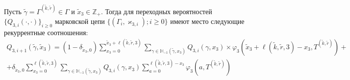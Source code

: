 \documentclass[a4paper,12pt,russian]{extarticle}
\newcommand{\MarkThree}{\{(\Gamma_i, \varkappa_{3,i}); i \geqslant 0\}}
\begin{document}
\begin{theorem}
Пусть $\tilde{\gamma} =\Gamma^{(\tilde{k},\tilde{r})}\in \Gamma$ и $\tilde{x}_3 \in {\mathbb Z}_+$. Тогда для переходных вероятностей $\{Q_{3,i}(\cdot,\cdot)\}_{i\geqslant 0}$ марковской цепи $\MarkThree$ имеют место следующие рекуррентные соотношения:
\begin{multline}
Q_{3,i+1}(\tilde{\gamma},\tilde{x}_3) = (1-\delta_{\tilde{x}_3,0}) \sum_{x_3=0}^{\tilde{x}_3 +  \ell(\tilde{k},\tilde{r},3)}\sum_{\gamma \in {\mathbb H}_{-1}(\tilde{\gamma},x_3)} Q_{3,i}(\gamma,x_3) \times 
\varphi_3(\tilde{x}_3 + \ell(\tilde{k},\tilde{r},3) - x_3,T^{(\tilde{k},\tilde{r})}) + \\
+ \delta_{\tilde{x}_3,0} \sum_{x_3=0}^{\ell(\tilde{k},\tilde{r},3)}\sum_{\gamma \in {\mathbb H}_{-1}(\tilde{\gamma},x_3)} Q_{3,i}(\gamma,x_3) \sum_{a=0}^{\ell(\tilde{k},\tilde{r},3) - x_3} \varphi_3(a,T^{(\tilde{k},\tilde{r})})
\label{prob:rek}
\end{multline}
\end{theorem}
\end{document}
